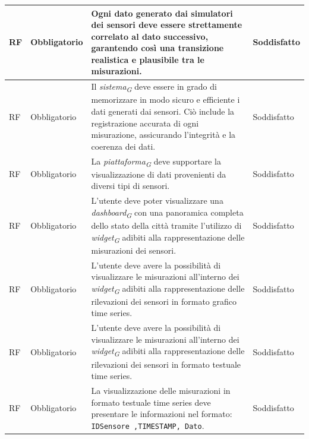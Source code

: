 \begin{longtable}{|C{1.5cm}|C{2cm}|L{5cm}|C{2cm}|}
    \hline
     RF & Obbligatorio &  Ogni dato generato dai simulatori dei sensori deve essere strettamente correlato al dato successivo, garantendo così una transizione realistica e plausibile tra le misurazioni.& Soddisfatto \\
    
    \hline
     RF & Obbligatorio & Il \textit{sistema}\textsubscript{\textit{G}} deve essere in grado di memorizzare in modo sicuro e efficiente i dati generati dai sensori. Ciò include la registrazione accurata di ogni misurazione, assicurando l'integrità e la coerenza dei dati.& Soddisfatto \\
    
    \hline
     RF & Obbligatorio & La \textit{piattaforma}\textsubscript{\textit{G}} deve supportare la visualizzazione di dati provenienti da diversi tipi di sensori.& Soddisfatto \\
    
    \hline
     RF & Obbligatorio & L'utente deve poter visualizzare una \textit{dashboard}\textsubscript{\textit{G}} con una panoramica completa dello stato della città tramite l'utilizzo di \textit{widget}\textsubscript{\textit{G}} adibiti alla rappresentazione delle misurazioni dei sensori.& Soddisfatto \\
    
    \hline
     RF & Obbligatorio & L'utente deve avere la possibilità di visualizzare le misurazioni all'interno dei \textit{widget}\textsubscript{\textit{G}} adibiti alla rappresentazione delle rilevazioni dei sensori in formato grafico time series.& Soddisfatto \\
    
    \hline
     RF & Obbligatorio & L'utente deve avere la possibilità di visualizzare le misurazioni all'interno dei \textit{widget}\textsubscript{\textit{G}} adibiti alla rappresentazione delle rilevazioni dei sensori in formato testuale time series.& Soddisfatto \\
    
    \hline
     RF & Obbligatorio & La visualizzazione delle misurazioni in formato testuale time series deve presentare le informazioni nel formato: \texttt{IDSensore ,TIMESTAMP, Dato}.& Soddisfatto \\
   

\end{longtable}
